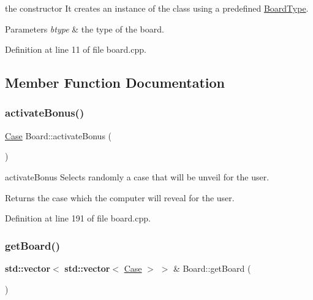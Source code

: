 the constructor It creates an instance of the class using a predefined \hyperlink{struct_board_type}{Board\+Type}. 


\begin{DoxyParams}{Parameters}
{\em btype} & the type of the board. \\
\hline
\end{DoxyParams}


Definition at line 11 of file board.\+cpp.



\subsection{Member Function Documentation}
\mbox{\label{class_board_a66b4889df2323241f10aca4b1d38bdf5}} 
\subsubsection{\texorpdfstring{activate\+Bonus()}{activateBonus()}}
{\footnotesize\ttfamily \hyperlink{class_case}{Case} Board\+::activate\+Bonus (\begin{DoxyParamCaption}{ }\end{DoxyParamCaption})}



activate\+Bonus Selects randomly a case that will be unveil for the user. 

\begin{DoxyReturn}{Returns}
the case which the computer will reveal for the user. 
\end{DoxyReturn}


Definition at line 191 of file board.\+cpp.

\mbox{\label{class_board_af801e2935f37e23a3714d034e231a5ba}} 
\subsubsection{\texorpdfstring{get\+Board()}{getBoard()}}
{\footnotesize\ttfamily \textbf{ std\+::vector}$<$ \textbf{ std\+::vector}$<$ \hyperlink{class_case}{Case} $>$ $>$ \& Board\+::get\+Board (\begin{DoxyParamCaption}{ }\end{DoxyParamCaption})\hspace{0.3cm}{\ttfamily [inline]}}



